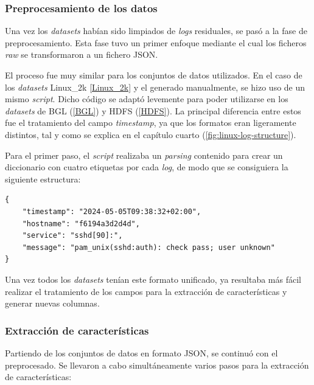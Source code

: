 \subsubsection*{Preprocesamiento de los datos}

Una vez los \textit{datasets} habían sido limpiados de \textit{logs} residuales, se pasó a la fase de preprocesamiento. Esta fase tuvo un primer enfoque mediante el cual los ficheros \textit{raw} se transformaron a un fichero \gls{JSON}.

El proceso fue muy similar para los conjuntos de datos utilizados. En el caso de los \textit{datasets} Linux\_2k \ref{Linux_2k} y el generado manualmente, se hizo uso de un mismo \textit{script}. Dicho código se adaptó levemente para poder utilizarse en los \textit{datasets} de \gls{BGL} (\ref{BGL}) y \gls{HDFS} (\ref{HDFS}). La principal diferencia entre estos fue el tratamiento del campo \textit{timestamp}, ya que los formatos eran ligeramente distintos, tal y como se explica en el capítulo cuarto (\ref{fig:linux-log-structure}).

\newpage

Para el primer paso, el \textit{script} realizaba un \textit{parsing} contenido para crear un diccionario con cuatro etiquetas por cada \textit{log}, de modo que se consiguiera la siguiente estructura:

\begin{center}
\begin{mdframed}
\footnotesize
    \begin{verbatim}
{
    "timestamp": "2024-05-05T09:38:32+02:00",
    "hostname": "f6194a3d2d4d",
    "service": "sshd[90]:",
    "message": "pam_unix(sshd:auth): check pass; user unknown"
}
    \end{verbatim}
\end{mdframed}
\end{center}

Una vez todos los \textit{datasets} tenían este formato unificado, ya resultaba más fácil realizar el tratamiento de los campos para la extracción de características y generar nuevas columnas. 

\subsubsection*{Extracción de características}

Partiendo de los conjuntos de datos en formato \gls{JSON}, se continuó con el preprocesado. Se llevaron a cabo simultáneamente varios pasos \footnotemark para la extracción de características:


